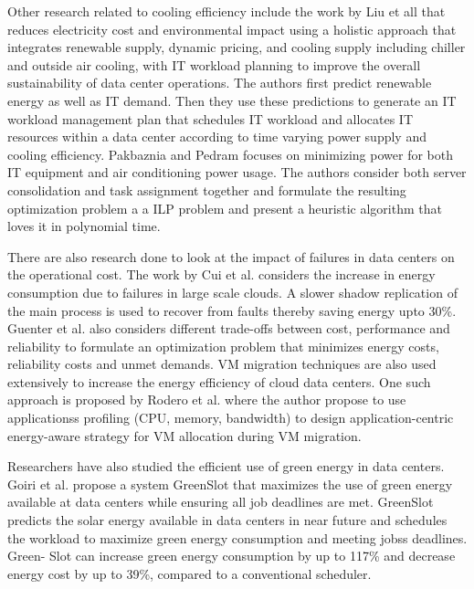 \documentclass[letterpaper,twocolumn,10pt]{article}
\begin{document}
\iffalse


Other research related to cooling efficiency include the work by Liu et all \cite{liu2012renewable}  that reduces electricity cost and environmental impact using a holistic approach that integrates renewable supply, dynamic pricing, and cooling supply including chiller and outside air cooling, with IT workload planning to improve the overall sustainability of data center operations. The authors first predict renewable energy as well as IT demand. Then they use these predictions to generate an IT workload management plan that schedules IT workload and allocates IT resources within a data center according to time varying power supply and cooling efficiency. Pakbaznia and Pedram \cite{pakbaznia2009minimizing} focuses on minimizing power for both IT equipment and air conditioning power usage. The authors consider both server consolidation and task assignment together and formulate the resulting optimization problem a a ILP problem and present a heuristic algorithm that loves it in polynomial time.

There are also research done to look at the impact of failures in data centers on the operational cost. The work by Cui et al. \cite{cui2014shadows} considers the increase in energy consumption due to failures in large scale clouds. A slower shadow replication of the main process is used to recover from faults thereby saving energy upto 30\%. Guenter et al. \cite{guenter2011managing} also considers different trade-offs between cost, performance and reliability to formulate an optimization problem that minimizes energy costs, reliability costs and unmet demands. VM migration techniques are also used extensively to increase the energy efficiency of cloud data centers. One such approach is proposed by Rodero et al. \cite{rodero2012energy} where the author  propose to use applicationss profiling (CPU, memory, bandwidth) to  design application-centric energy-aware strategy for VM allocation during VM migration.

Researchers have also studied the efficient use of green energy in data centers. Goiri et al. \cite{goiri2011greenslot} propose a system GreenSlot that maximizes the use of green energy available at data centers while ensuring all job deadlines are met. GreenSlot predicts the solar energy available in data centers in near future and schedules the workload to maximize green energy consumption and meeting jobss deadlines. Green- Slot can increase green energy consumption by up to 117\% and decrease energy cost by up to 39\%, compared to a conventional scheduler. 
\end{document}
